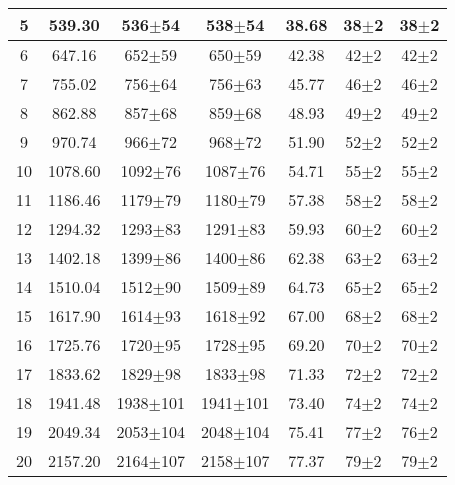 \begin{table}[h!]
\begin{tabular}{|c|c|c|c|c|c|c|}
5&539.30&536$\pm$54&538$\pm$54&38.68&38$\pm$2&38$\pm$2\\ \hline 
6&647.16&652$\pm$59&650$\pm$59&42.38&42$\pm$2&42$\pm$2\\ \hline 
7&755.02&756$\pm$64&756$\pm$63&45.77&46$\pm$2&46$\pm$2\\ \hline 
8&862.88&857$\pm$68&859$\pm$68&48.93&49$\pm$2&49$\pm$2\\ \hline 
9&970.74&966$\pm$72&968$\pm$72&51.90&52$\pm$2&52$\pm$2\\ \hline 
10&1078.60&1092$\pm$76&1087$\pm$76&54.71&55$\pm$2&55$\pm$2\\ \hline 
11&1186.46&1179$\pm$79&1180$\pm$79&57.38&58$\pm$2&58$\pm$2\\ \hline 
12&1294.32&1293$\pm$83&1291$\pm$83&59.93&60$\pm$2&60$\pm$2\\ \hline 
13&1402.18&1399$\pm$86&1400$\pm$86&62.38&63$\pm$2&63$\pm$2\\ \hline 
14&1510.04&1512$\pm$90&1509$\pm$89&64.73&65$\pm$2&65$\pm$2\\ \hline 
15&1617.90&1614$\pm$93&1618$\pm$92&67.00&68$\pm$2&68$\pm$2\\ \hline 
16&1725.76&1720$\pm$95&1728$\pm$95&69.20&70$\pm$2&70$\pm$2\\ \hline 
17&1833.62&1829$\pm$98&1833$\pm$98&71.33&72$\pm$2&72$\pm$2\\ \hline 
18&1941.48&1938$\pm$101&1941$\pm$101&73.40&74$\pm$2&74$\pm$2\\ \hline 
19&2049.34&2053$\pm$104&2048$\pm$104&75.41&77$\pm$2&76$\pm$2\\ \hline 
20&2157.20&2164$\pm$107&2158$\pm$107&77.37&79$\pm$2&79$\pm$2\\ \hline 
\end{tabular} 
\end{table} 
